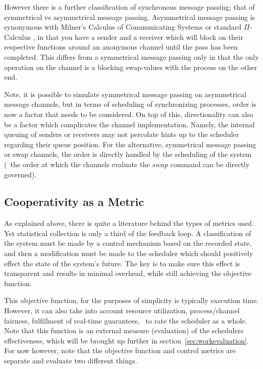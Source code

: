 However there is a further classification of synchronous message passing; that of symmetrical vs asymmetrical message passing. 
Asymmetrical message passing is synonymous with Milner's Calculus of Communicating Systems \cite{milner1982calculus} 
or standard $\Pi$-Calculus \cite{palamidessi1997comparing}, in that you have a sender and a receiver which will 
block on their respective functions around an anonymous channel until the pass has been completed. This differs from a 
symmetrical message passing only in that the only operation on the channel is a blocking swap-values with the
process on the other end. 

Note, it is possible to simulate symmetrical message passing on asymmetrical message channels, but in terms of scheduling of
synchronizing processes, order is now a factor that needs to be considered. On top of this, directionality can also be a factor
which complicates the channel implementation. Namely, the internal queuing of senders or receivers may not percolate hints up to
the scheduler regarding their queue position. For the alternative, symmetrical message passing or swap channels, the order is
directly handled by the scheduling of the system (\ie~the order at which the channels evaluate the $swap$ command can be 
directly governed).

\subsection{Cooperativity as a Metric}


As explained above, there is quite a literature behind the types of metrics used. Yet statistical collection is 
only a third of the feedback loop. A classification of the system must be made by a control mechanism based on the 
recorded state, and then a modification must be made to the scheduler which should positively 
effect the state of the system's future. The key is to make sure this effect is transparent and results in minimal
overhead, while still achieving the objective function.

This objective function, for the purposes of simplicity is typically execution time. However, it can also take into
account resource utilization, process/channel fairness, fulfillment of real-time guarantees, \etc~to rate the 
scheduler as a whole. Note that this function is an external measure (evaluation) of the schedulers effectiveness,
which will be brought up further in section~\ref{sec:workevaluation}. For now however, note that the objective 
function and control metrics are separate and evaluate two different things.

